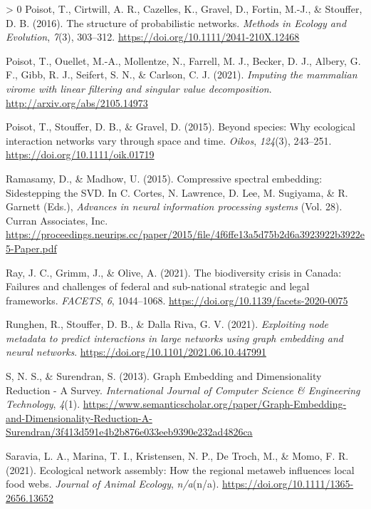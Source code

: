 \documentclass[11pt]{article}
\newlength{\cslhangindent}
\newenvironment{CSLReferences}[3] %
 {%
  \setlength{\parindent}{0pt}
  \ifodd #1 \everypar{\setlength{\hangindent}{\cslhangindent}}\ignorespaces\fi
  \ifnum #2 > 0
  \setlength{\parskip}{#2\baselineskip}
  \fi
 }%
 {}
\begin{document}
\begin{CSLReferences}{1}{0}
\leavevmode\hypertarget{ref-Poisot2016StrPro}{}%
Poisot, T., Cirtwill, A. R., Cazelles, K., Gravel, D., Fortin, M.-J., \&
Stouffer, D. B. (2016). The structure of probabilistic networks.
\emph{Methods in Ecology and Evolution}, \emph{7}(3), 303--312.
\url{https://doi.org/10.1111/2041-210X.12468}

\leavevmode\hypertarget{ref-Poisot2021ImpMam}{}%
Poisot, T., Ouellet, M.-A., Mollentze, N., Farrell, M. J., Becker, D.
J., Albery, G. F., Gibb, R. J., Seifert, S. N., \& Carlson, C. J.
(2021). \emph{Imputing the mammalian virome with linear filtering and
singular value decomposition}. \url{http://arxiv.org/abs/2105.14973}

\leavevmode\hypertarget{ref-Poisot2015SpeWhy}{}%
Poisot, T., Stouffer, D. B., \& Gravel, D. (2015). Beyond species: Why
ecological interaction networks vary through space and time.
\emph{Oikos}, \emph{124}(3), 243--251.
\url{https://doi.org/10.1111/oik.01719}

\leavevmode\hypertarget{ref-Ramasamy2015ComSpe}{}%
Ramasamy, D., \& Madhow, U. (2015). Compressive spectral embedding:
Sidestepping the SVD. In C. Cortes, N. Lawrence, D. Lee, M. Sugiyama, \&
R. Garnett (Eds.), \emph{Advances in neural information processing
systems} (Vol. 28). Curran Associates, Inc.
\url{https://proceedings.neurips.cc/paper/2015/file/4f6ffe13a5d75b2d6a3923922b3922e5-Paper.pdf}

\leavevmode\hypertarget{ref-Ray2021BioCri}{}%
Ray, J. C., Grimm, J., \& Olive, A. (2021). The biodiversity crisis in
Canada: Failures and challenges of federal and sub-national strategic
and legal frameworks. \emph{FACETS}, \emph{6}, 1044--1068.
\url{https://doi.org/10.1139/facets-2020-0075}

\leavevmode\hypertarget{ref-Runghen2021ExpNod}{}%
Runghen, R., Stouffer, D. B., \& Dalla Riva, G. V. (2021).
\emph{Exploiting node metadata to predict interactions in large networks
using graph embedding and neural networks}.
\url{https://doi.org/10.1101/2021.06.10.447991}

\leavevmode\hypertarget{ref-S2013GraEmb}{}%
S, N. S., \& Surendran, S. (2013). Graph Embedding and Dimensionality
Reduction - A Survey. \emph{International Journal of Computer Science \&
Engineering Technology}, \emph{4}(1).
\url{https://www.semanticscholar.org/paper/Graph-Embedding-and-Dimensionality-Reduction-A-Surendran/3f413d591e4b2b876e033eeb9390e232ad4826ca}

\leavevmode\hypertarget{ref-Saravia2021EcoNet}{}%
Saravia, L. A., Marina, T. I., Kristensen, N. P., De Troch, M., \& Momo,
F. R. (2021). Ecological network assembly: How the regional metaweb
influences local food webs. \emph{Journal of Animal Ecology},
\emph{n/a}(n/a). \url{https://doi.org/10.1111/1365-2656.13652}


\end{CSLReferences}
\end{document}
